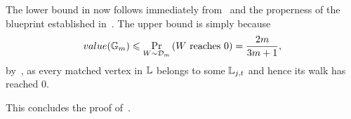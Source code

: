 The lower bound in  now follows immediately from~ and the properness of the blueprint  established in~. The upper bound is simply because 
\[
	value(\mathbb{G}_m) \leqslant \operatorname*{\textnormal{Pr}}_{W \sim \mathcal{D}_m}\left(\text{$W$ reaches $0$}\right) = \frac{2m}{3m+1}, 
\]
by~, as every matched vertex in $\mathbb{L}$ belongs to some $\mathbb{L}_{j,t}$ and hence its walk has reached $0$. 

This concludes the proof of~. 
